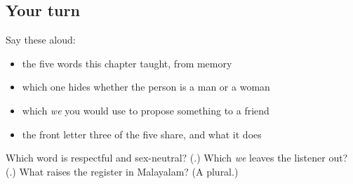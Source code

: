 \subsection*{Your turn}
Say these aloud:

\begin{itemize}
\raggedright
  \item the five words this chapter taught, from memory
  \item which one hides whether the person is a man or a woman
  \item which \emph{we} you would use to propose something to a friend
  \item the front letter three of the five share, and what it does
\end{itemize}

\begin{tcolorbox}[breakable,colback=teal!4,colframe=teal!35!black,title={Before you move on}]
Which word is respectful and sex-neutral? (\textbf{}.) Which \emph{we} leaves the listener out? (\textbf{}.) What raises the register in Malayalam? (A plural.)
\end{tcolorbox}
